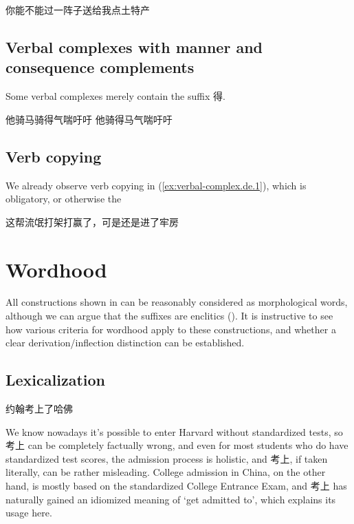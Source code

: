 \documentclass[UTF8, a4paper, oneside, scheme=plain, 12pt]{ctexrep}
\newcommand{\translate}[1]{`#1'}
\begin{document}
\begin{exe}
    \ex\label{ex:sec:verbal-complex.v-neg-v.4} 你能不能过一阵子送给我点土特产
\end{exe}

\subsection{Verbal complexes with manner and consequence complements}
\label{sec:verbal-complex.de}

Some verbal complexes merely contain the suffix 得.


\begin{exe}
    \ex\label{ex:verbal-complex.de.1} 他骑马骑得气喘吁吁
    \ex 他骑得马气喘吁吁
\end{exe}

\subsection{Verb copying}

We already observe verb copying in (\ref{ex:verbal-complex.de.1}),
which is obligatory, or otherwise the 

\begin{exe}
    \ex 这帮流氓打架打赢了，可是还是进了牢房
\end{exe}

\section{Wordhood}\label{sec:verbal-complex.wordhood}

All constructions shown in 
can be reasonably considered as morphological words,
although we can argue that the suffixes are enclitics
().
It is instructive to see how various criteria for wordhood apply to these constructions,
and whether a clear derivation/inflection distinction can be established.

\subsection{Lexicalization}

\begin{exe}
    \ex 约翰考上了哈佛
\end{exe}

We know nowadays it's possible to enter Harvard without standardized tests,
so 考上 can be completely factually wrong,
and even for most students who do have standardized test scores,
the admission process is holistic, and 考上, if taken literally,
can be rather misleading.
College admission in China, on the other hand, is mostly based on the standardized College Entrance Exam,
and 考上 has naturally gained an idiomized meaning of \translate{get admitted to},
which explains its usage here.
\end{document}
